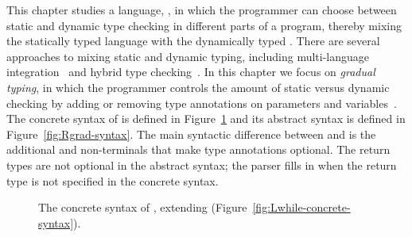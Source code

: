 \documentclass[7x10,nocrop]{TimesAPriori_MIT}%
\newcommand{\gray}[1]{{\color{gray} #1}}
\begin{document}
This chapter studies a language, \LangGrad{}, in which the programmer
can choose between static and dynamic type checking in different parts
of a program, thereby mixing the statically typed \LangLoop{} language
with the dynamically typed \LangDyn{}. There are several approaches to
mixing static and dynamic typing, including multi-language
integration~\citep{Tobin-Hochstadt:2006fk,Matthews:2007zr} and hybrid
type checking~\citep{Flanagan:2006mn,Gronski:2006uq}. In this chapter
we focus on \emph{gradual typing}, in which the
programmer controls the amount of static versus dynamic checking by
adding or removing type annotations on parameters and
variables~\citep{Anderson:2002kd,Siek:2006bh}.
%
The concrete syntax of \LangGrad{} is defined in
Figure~\ref{fig:Rgrad-concrete-syntax} and its abstract syntax is defined
in Figure~\ref{fig:Rgrad-syntax}. The main syntactic difference between
\LangLoop{} and \LangGrad{} is the additional  and 
non-terminals that make type annotations optional. The return types
are not optional in the abstract syntax; the parser fills in
 when the return type is not specified in the concrete
syntax.

\begin{figure}[tp]
\centering
\fbox{
  \begin{minipage}{0.96\textwidth}
    \small
\[
\begin{array}{lcl}
  \itm{param} &::=& \Var \MID \LS\Var \key{:} \Type\RS \\
  \itm{ret} &::=& \epsilon \MID \key{:} \Type \\
  \Exp &::=& \gray{ \Int \MID \CREAD{} \MID \CNEG{\Exp}
     \MID \CADD{\Exp}{\Exp} \MID \CSUB{\Exp}{\Exp} }  \\
    &\MID&  \gray{ \Var \MID \CLET{\Var}{\Exp}{\Exp} }\\
    &\MID& \gray{\key{\#t} \MID \key{\#f} 
     \MID (\key{and}\;\Exp\;\Exp) 
     \MID (\key{or}\;\Exp\;\Exp) 
     \MID (\key{not}\;\Exp) } \\
    &\MID& \gray{ (\key{eq?}\;\Exp\;\Exp) \MID \CIF{\Exp}{\Exp}{\Exp} } \\
    &\MID& \gray{ (\key{vector}\;\Exp\ldots) \MID
          (\key{vector-ref}\;\Exp\;\Int)} \\
    &\MID& \gray{(\key{vector-set!}\;\Exp\;\Int\;\Exp)\MID (\key{void})
    \MID (\Exp \; \Exp\ldots) } \\
    &\MID& \gray{ \LP \key{procedure-arity}~\Exp\RP }
    \MID \CGLAMBDA{\LP\itm{param}\ldots\RP}{\itm{ret}}{\Exp} \\
  &\MID& \gray{ \CSETBANG{\Var}{\Exp}
  \MID \CBEGIN{\Exp\ldots}{\Exp}
  \MID \CWHILE{\Exp}{\Exp} } \\
  \Def &::=& \CGDEF{\Var}{\itm{param}\ldots}{\itm{ret}}{\Exp} \\
  \LangGradM{} &::=& \gray{\Def\ldots \; \Exp}
\end{array}
\]
\end{minipage}
}
\caption{The concrete syntax of \LangGrad{}, extending \LangLoop{} (Figure~\ref{fig:Lwhile-concrete-syntax}).}
\label{fig:Rgrad-concrete-syntax}
\end{figure}
\end{document}
